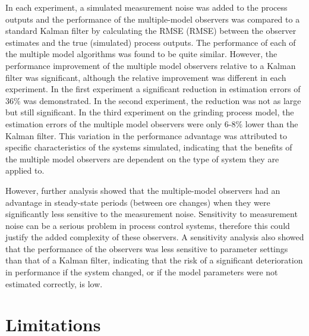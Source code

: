 In each experiment, a simulated measurement noise was added to the process outputs and the performance of the multiple-model observers was compared to a standard Kalman filter by calculating the \acrlong{RMSE} (\acrshort{RMSE}) between the observer estimates and the true (simulated) process outputs. The performance of each of the multiple model algorithms was found to be quite similar. However, the performance improvement of the multiple model observers relative to a Kalman filter was significant, although the relative improvement was different in each experiment. In the first experiment a significant reduction in estimation errors of 36\% was demonstrated. In the second experiment, the reduction was not as large but still significant. In the third experiment on the grinding process model, the estimation errors of the multiple model observers were only 6-8\% lower than the Kalman filter. This variation in the performance advantage was attributed to specific characteristics of the systems simulated, indicating that the benefits of the multiple model observers are dependent on the type of system they are applied to.

However, further analysis showed that the multiple-model observers had an advantage in steady-state periods (between ore changes) when they were significantly less sensitive to the measurement noise. Sensitivity to measurement noise can be a serious problem in process control systems, therefore this could justify the added complexity of these observers. A sensitivity analysis also showed that the performance of the observers was less sensitive to parameter settings than that of a Kalman filter, indicating that the risk of a significant deterioration in performance if the system changed, or if the model parameters were not estimated correctly, is low.

\section*{Limitations}

